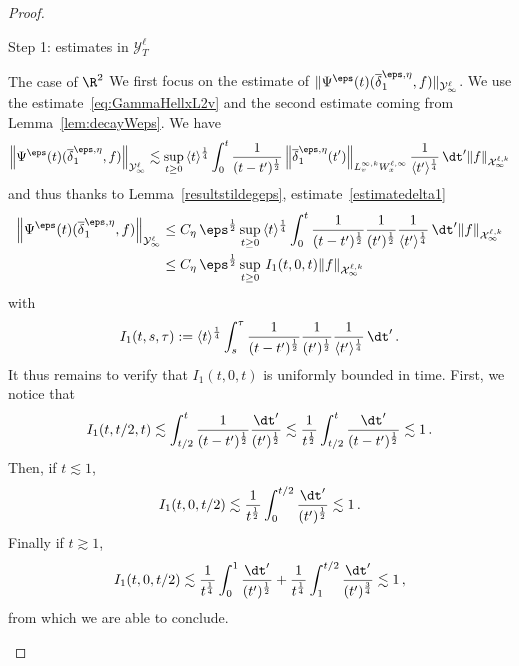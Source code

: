 \begin{proof}
\begin{step}{Step 1: estimates in $\mathcal{Y}^\ell_T$}
\begin{step}{The case of $\R^2$}
We first focus on the estimate of $\|\Psi^\eps(t) (\overline \delta^{\eps,\eta}_1, f)\|_{\mathcal{Y}^\ell_\infty}$. We use the estimate~\eqref{eq:GammaHellxL2v} and the second estimate coming from Lemma~\ref{lem:decayWeps}. We have
\begin{align*}
\left\|\Psi^\eps(t) (\overline \delta^{\eps,\eta}_1,f)\right\|_{\mathcal{Y}^\ell_\infty} \lesssim \sup_{t \ge 0} \, \langle t \rangle^\frac{1}{4} \int_0^t \frac{1}{{(t-t')^\frac{1}{2}}} \left\|\overline \delta^{\eps,\eta}_1(t')\right\|_{L^{\infty,k}_vW^{\ell,\infty}_x} \frac{1}{\langle t' \rangle^\frac{1}{4}} \, \dt' \|f\|_{\mathcal{X}^{\ell,k}_\infty}
\end{align*}
and thus thanks to Lemma~\ref{resultstildegeps}, estimate~\eqref{estimatedelta1}
\begin{align*}
\left\|\Psi^\eps(t) (\overline \delta^{\eps,\eta}_1, f)\right\|_{\mathcal{Y}^\ell_\infty} &\le C_\eta \, \eps^\frac{1}{2} \sup_{t \ge 0} \, \langle t \rangle^\frac{1}{4} \int_0^t \frac{1}{{(t-t')^\frac{1}{2}}} \frac{1}{(t')^\frac{1}{2}} \frac{1}{\langle t' \rangle^\frac{1}{4}} \, \dt' \|f\|_{\mathcal{X}^{\ell,k}_\infty} \\
&\le C_\eta \, \eps^\frac{1}{2} \sup_{t \ge 0} \, I_1(t,0,t) \|f\|_{\mathcal{X}^{\ell,k}_\infty}
\end{align*}
with
\[
I_1(t,s,\tau) := \langle t \rangle^\frac{1}{4} \int_s^\tau \frac{1}{{(t-t')^\frac{1}{2}}} \frac{1}{(t')^\frac{1}{2}} \frac{1}{\langle t' \rangle^\frac{1}{4}} \, \dt' \,.
\]
It thus remains to verify that $I_1(t,0,t)$ is uniformly bounded in time. First, we notice that
\[
I_1(t,t/2,t)
\lesssim \int_{t/2}^t \frac{1}{{(t-t')^\frac{1}{2}}} \frac{\dt'}{(t')^\frac{1}{2}} \lesssim \frac{1}{t^\frac{1}{2}} \int_{t/2}^t \frac{\dt'}{{(t-t')^\frac{1}{2}}} \lesssim 1 \,.
\]
Then, if $t \lesssim 1$,
\[
I_1(t,0,t/2)
\lesssim \frac{1}{t^\frac{1}{2}} \int_0^{t/2} \frac{\dt'}{(t')^\frac{1}{2}} \lesssim 1 \,.
\]
Finally if $t \gtrsim 1$,
\[
I_1(t,0,t/2)
\lesssim \frac{1}{t^\frac{1}{4}} \int_0^1 \frac{\dt'}{(t')^\frac{1}{2}} + \frac{1}{t^\frac{1}{4}} \int_1^{t/2} \frac{\dt'}{(t')^\frac{3}{4}} \lesssim 1 \,,
\]
from which we are able to conclude.


\end{step}
\end{step}
\end{proof}
